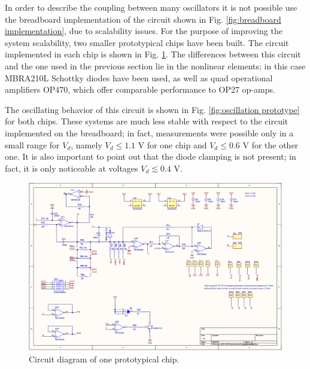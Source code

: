 In order to describe the coupling between many oscillators it is
not possible use the breadboard implementation of the circuit
shown in Fig. \ref{fig:breadboard implementation}, due to
scalability issues. For the purpose of improving the system
scalability, two smaller prototypical chips have been built.
The circuit implemented in each chip is shown in Fig.
\ref{fig:prototype implementation}. The differences between this
circuit and the one used in the previous section lie in the nonlinear
elements; in this case MBRA210L Schottky diodes have been used,
as well as quad operational amplifiers OP470, which offer
comparable performance to OP27 op-amps.

The oscillating behavior of this circuit is shown in Fig.
\ref{fig:oscillation prototype} for both chips. These systems are much
less stable with respect to the circuit implemented on the breadboard;
in fact, measurements were possible only in a small range for $V_d$,
namely $V_d \leq 1.1$ V for one chip and $V_d \leq 0.6$ V for the
other one. It is also important to point out that the diode clamping
is not present; in fact, it is only noticeable at voltages
$V_d \lesssim 0.4$ V.


\begin{figure}[H]
    \centering
    \includegraphics[width=0.75\linewidth]
    {../1_block/prototypes/prototype_implementation.png}
    \caption{Circuit diagram of one prototypical chip.}
    \label{fig:prototype implementation}
\end{figure}

